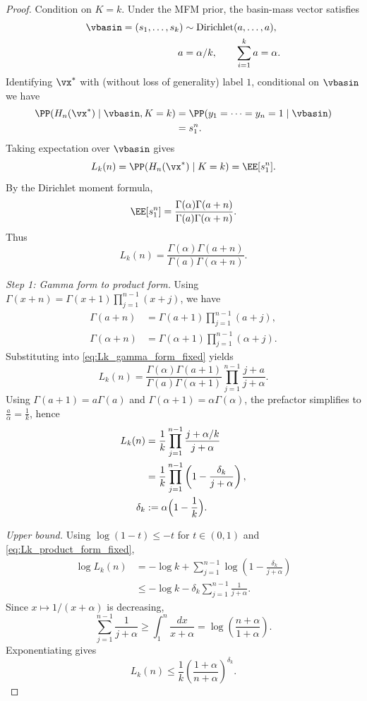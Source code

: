\begin{proof}\label{proof:Lk_twosided_fixed}
Condition on $K=k$. Under the MFM prior, the basin-mass vector satisfies
\[
\begin{aligned}
\vbasin=(s_1,\dots,s_k)
&\sim\operatorname{Dirichlet}(a,\dots,a),\\
a&=\alpha/k,
\qquad \sum_{i=1}^k a=\alpha.
\end{aligned}
\]
Identifying $\vx^*$ with (without loss of generality) label $1$, conditional on $\vbasin$ we have
\[
\begin{aligned}
\PP(H_n(\vx^*)\mid \vbasin,K=k)
&=\PP(y_1=\cdots=y_n=1\mid \vbasin)\\
&=s_1^{n}.
\end{aligned}
\]
Taking expectation over $\vbasin$ gives
\[
L_k(n)=\PP(H_n(\vx^*)\mid K=k)=\EE[s_1^{n}].
\]
By the Dirichlet moment formula,
\[
\EE[s_1^{n}]
=\frac{\Gamma(\alpha)\Gamma(a+n)}{\Gamma(a)\Gamma(\alpha+n)}.
\]
Thus
\begin{equation}\label{eq:Lk_gamma_form_fixed}
L_k(n)
=\frac{\Gamma(\alpha)\Gamma(a+n)}{\Gamma(a)\Gamma(\alpha+n)}.
\end{equation}

\emph{Step 1: Gamma form to product form.}
Using $\Gamma(x+n)=\Gamma(x+1)\prod_{j=1}^{n-1}(x+j)$, we have
\[
\begin{aligned}
\Gamma(a+n)
&=\Gamma(a+1)\prod_{j=1}^{n-1}(a+j),\\
\Gamma(\alpha+n)
&=\Gamma(\alpha+1)\prod_{j=1}^{n-1}(\alpha+j).
\end{aligned}
\]
Substituting into \eqref{eq:Lk_gamma_form_fixed} yields
\[
L_k(n)
=\frac{\Gamma(\alpha)\Gamma(a+1)}{\Gamma(a)\Gamma(\alpha+1)}
\prod_{j=1}^{n-1}\frac{j+a}{j+\alpha}.
\]
Using $\Gamma(a+1)=a\Gamma(a)$ and $\Gamma(\alpha+1)=\alpha\Gamma(\alpha)$,
the prefactor simplifies to $\frac{a}{\alpha}=\frac1k$, hence
\begin{equation}\label{eq:Lk_product_form_fixed}
\begin{aligned}
L_k(n)
&=\frac1k\prod_{j=1}^{n-1}\frac{j+\alpha/k}{j+\alpha}\\
&=\frac1k\prod_{j=1}^{n-1}
\left(1-\frac{\delta_k}{j+\alpha}\right),\\
\delta_k&:=\alpha\Bigl(1-\frac1k\Bigr).
\end{aligned}
\end{equation}

\emph{Upper bound.}
Using $\log(1-t)\le -t$ for $t\in(0,1)$ and \eqref{eq:Lk_product_form_fixed},
\[
\begin{aligned}
\log L_k(n)
&=-\log k
+\sum_{j=1}^{n-1}
\log\!\left(1-\frac{\delta_k}{j+\alpha}\right)\\
&\le -\log k
-\delta_k\sum_{j=1}^{n-1}\frac{1}{j+\alpha}.
\end{aligned}
\]
Since $x\mapsto 1/(x+\alpha)$ is decreasing,
\[
\sum_{j=1}^{n-1}\frac{1}{j+\alpha}\ge \int_{1}^{n}\frac{dx}{x+\alpha}
=\log\!\left(\frac{n+\alpha}{1+\alpha}\right).
\]
Exponentiating gives
\[
L_k(n)\le \frac1k\left(\frac{1+\alpha}{n+\alpha}\right)^{\delta_k}.
\]


\end{proof}
